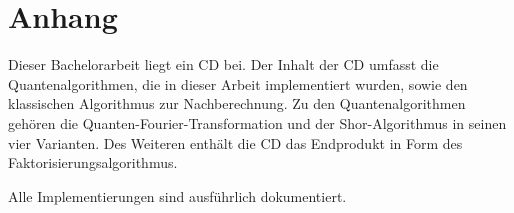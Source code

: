 \clearpage
\section{Anhang}
Dieser Bachelorarbeit liegt ein CD bei. 
Der Inhalt der CD umfasst die Quantenalgorithmen, 
die in dieser Arbeit implementiert wurden, sowie den klassischen Algorithmus zur Nachberechnung. 
Zu den Quantenalgorithmen gehören die Quanten-Fourier-Transformation und 
der Shor-Algorithmus in seinen vier Varianten. 
Des Weiteren enthält die CD das Endprodukt in Form des Faktorisierungsalgorithmus. 

Alle Implementierungen sind ausführlich dokumentiert.
